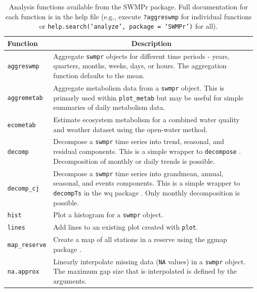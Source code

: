 \documentclass[10pt,letterpaper]{article}\usepackage[]{graphicx}\usepackage[]{color}
\begin{document}
\begin{table}[!tbp]
\caption{Analysis functions available from the SWMPr package.  Full documentation for each function is in the help file (e.g., execute \texttt{?aggreswmp} for individual functions or \texttt{help.search(`analyze', package = `SWMPr')} for all).\label{tab:analyze}} 
\begin{center}
\begin{tabular}{lp{3.5in}}
\hline\hline
\multicolumn{1}{l}{Function}&\multicolumn{1}{c}{Description}\tabularnewline
\hline
\texttt{aggreswmp}&Aggregate \texttt{swmpr} objects for different time periods - years, quarters, months,  weeks, days, or hours.  The aggregation function defaults to the mean.\tabularnewline
\texttt{aggremetab}&Aggregate metabolism data from a \texttt{swmpr} object.  This is primarly used within \texttt{plot\_metab} but may be useful for simple summaries of daily metabolism data.\tabularnewline
\texttt{ecometab}&Estimate ecosystem metabolism for a combined water quality and weather dataset using the open-water method.\tabularnewline
\texttt{decomp}&Decompose a \texttt{swmpr} time series into trend, seasonal, and residual components.  This is a simple wrapper to \texttt{decompose} \cite{Kendall83}.  Decomposition of monthly or daily trends is possible.\tabularnewline
\texttt{decomp\_cj}&Decompose a \texttt{swmpr} time series into grandmean, annual, seasonal, and events components.  This is a simple wrapper to \texttt{decompTs} in the wq package \cite{Jassby14}.  Only monthly decomposition is possible.\tabularnewline
\texttt{hist}&Plot a histogram for a \texttt{swmpr} object.\tabularnewline
\texttt{lines}&Add lines to an existing plot created with \texttt{plot}.\tabularnewline
\texttt{map\_reserve}&Create a map of all stations in a reserve using the ggmap package \cite{Kahle13}.\tabularnewline
\texttt{na.approx}&Linearly interpolate missing data (\texttt{NA} values) in a \texttt{swmpr} object. The maximum gap size that is interpolated is defined by the arguments.\tabularnewline

\end{tabular}
\end{center}
\end{table}
\end{document}

